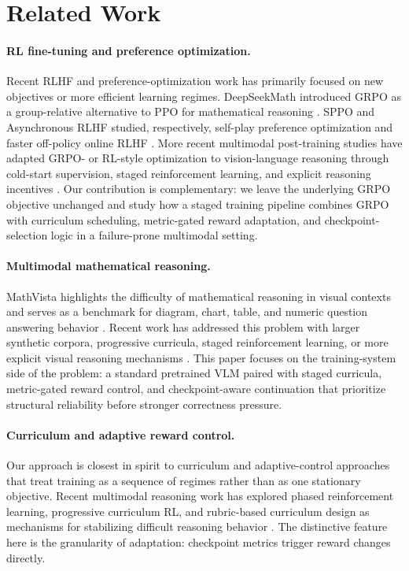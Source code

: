 \documentclass{article} %
\begin{document}
\section{Related Work}

\paragraph{RL fine-tuning and preference optimization.}
Recent RLHF and preference-optimization work has primarily focused on new objectives or more efficient learning regimes. DeepSeekMath introduced GRPO as a group-relative alternative to PPO for mathematical reasoning \citep{deepseekmath2024}. SPPO and Asynchronous RLHF studied, respectively, self-play preference optimization and faster off-policy online RLHF \citep{wu2025sppo,noukhovitch2025async}. More recent multimodal post-training studies have adapted GRPO- or RL-style optimization to vision-language reasoning through cold-start supervision, staged reinforcement learning, and explicit reasoning incentives \citep{huang2025visionr1,wei2025coldstart,chen2025revisualr1}. Our contribution is complementary: we leave the underlying GRPO objective unchanged and study how a staged training pipeline combines GRPO with curriculum scheduling, metric-gated reward adaptation, and checkpoint-selection logic in a failure-prone multimodal setting.

\paragraph{Multimodal mathematical reasoning.}
MathVista highlights the difficulty of mathematical reasoning in visual contexts and serves as a benchmark for diagram, chart, table, and numeric question answering behavior \citep{lu2024mathvista}. Recent work has addressed this problem with larger synthetic corpora, progressive curricula, staged reinforcement learning, or more explicit visual reasoning mechanisms \citep{zhang2025mavis,qi2025cogcom,liu2025infimmr,yuan2025vlcogito}. This paper focuses on the training-system side of the problem: a standard pretrained VLM paired with staged curricula, metric-gated reward control, and checkpoint-aware continuation that prioritize structural reliability before stronger correctness pressure.

\paragraph{Curriculum and adaptive reward control.}
Our approach is closest in spirit to curriculum and adaptive-control approaches that treat training as a sequence of regimes rather than as one stationary objective. Recent multimodal reasoning work has explored phased reinforcement learning, progressive curriculum RL, and rubric-based curriculum design as mechanisms for stabilizing difficult reasoning behavior \citep{liu2025infimmr,yuan2025vlcogito,chen2026rucl}. The distinctive feature here is the granularity of adaptation: checkpoint metrics trigger reward changes directly.
\end{document}
